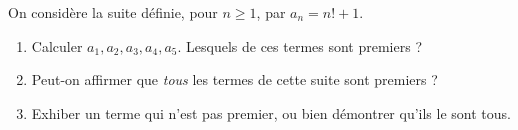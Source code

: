 On considère la suite définie, pour $n \geqslant 1$, par $a_n = n! + 1$.
\begin{enumerate}
  \item Calculer $a_1, a_2, a_3, a_4, a_5$. Lesquels de ces termes sont
  premiers ?
  \item Peut-on affirmer que \emph{tous} les termes de cette suite sont
  premiers ?
  \item Exhiber un terme qui n'est pas premier, ou bien démontrer qu'ils le
  sont tous.
\end{enumerate}
